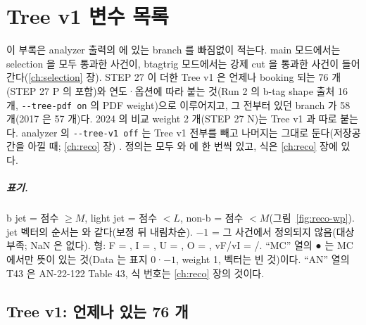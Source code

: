 \chapter{Tree v1 변수 목록}\label{ch:treev1}

이 부록은 analyzer 출력의  에 있는 branch 를 빠짐없이 적는다. main 모드에서는 selection 을 모두 통과한 사건이, btagtrig 모드에서는
강제 cut 을 통과한 사건이 들어간다(\ref{ch:selection} 장). STEP 27 이 더한 Tree v1 은 언제나 booking 되는 76 개(STEP 27 P 의  포함)와 연도·옵션에 따라 붙는 것(Run 2 의 b-tag
shape 출처 16 개, \texttt{-{}-tree-pdf on} 의 PDF weight)으로 이루어지고, 그 전부터 있던 branch 가 58 개(2017 은 57 개)다. 2024 의 비교 weight 2 개(STEP 27 N)는 Tree v1 과 따로 붙는다. analyzer 의 \texttt{-{}-tree-v1 off} 는 Tree v1 전부를 빼고 나머지는 그대로 둔다(저장공간을 아낄 때; \ref{ch:reco} 장)
. 정의는 모두  와  에 한 번씩 있고, 식은 \ref{ch:reco} 장에 있다.

\paragraph{표기.}
b jet = 점수 $\ge M$, light jet = 점수 $<L$, non-b = 점수 $<M$(그림~\ref{fig:reco-wp}). jet 벡터의 순서는  와 같다(보정 뒤 \pt{} 내림차순).
$-1$ = 그 사건에서 정의되지 않음(대상 부족; NaN 은 없다). 형: F = , I = , U = , O = ,
vF/vI = /. ``MC'' 열의 ● 는 MC 에서만 뜻이 있는 것(Data 는 표지 0·$-1$, weight 1, 벡터는 빈 것)이다.
``AN'' 열의 T43 은 AN-22-122 Table 43, 식 번호는 \ref{ch:reco} 장의 것이다.

\section{Tree v1: 언제나 있는 76 개}\label{sec:treev1-core}

